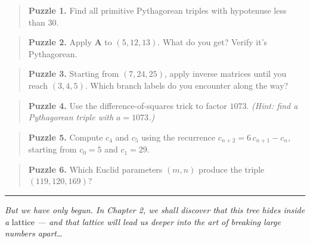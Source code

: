 \begin{quote}
\textbf{Puzzle 1.} Find all primitive Pythagorean triples with hypotenuse less than \(30\).
\end{quote}

\begin{quote}
\textbf{Puzzle 2.} Apply \(\mathbf{A}\) to \((5, 12, 13)\). What do you get? Verify it's Pythagorean.
\end{quote}

\begin{quote}
\textbf{Puzzle 3.} Starting from \((7, 24, 25)\), apply inverse matrices until you reach \((3, 4, 5)\). Which branch labels do you encounter along the way?
\end{quote}

\begin{quote}
\textbf{Puzzle 4.} Use the difference-of-squares trick to factor \(1073\). \emph{(Hint: find a Pythagorean triple with \(a = 1073\).)}
\end{quote}

\begin{quote}
\textbf{Puzzle 5.} Compute \(c_4\) and \(c_5\) using the recurrence \(c_{n+2} = 6\,c_{n+1} - c_n\), starting from \(c_0 = 5\) and \(c_1 = 29\).
\end{quote}

\begin{quote}
\textbf{Puzzle 6.} Which Euclid parameters \((m, n)\) produce the triple \((119, 120, 169)\)?
\end{quote}

\bigskip\noindent\rule{\linewidth}{0.4pt}\bigskip

\emph{But we have only begun. In Chapter 2, we shall discover that this tree hides inside a} lattice \emph{--- and that lattice will lead us deeper into the art of breaking large numbers apart\ldots{}}
